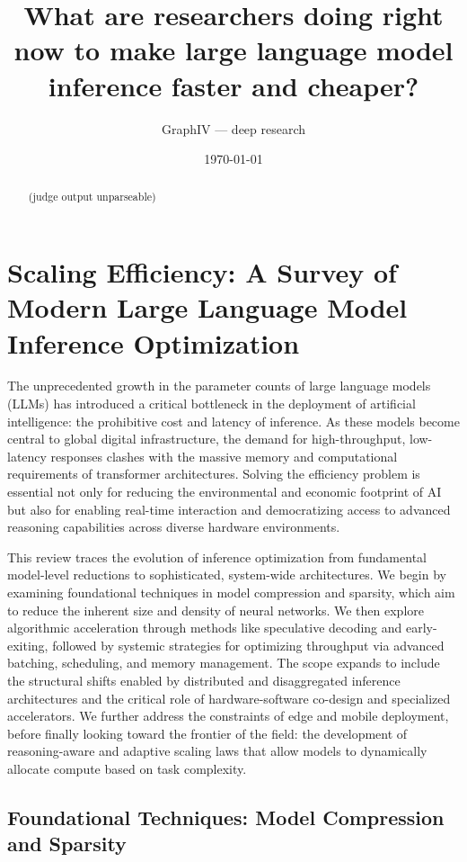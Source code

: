 \documentclass[11pt]{article}
\title{What are researchers doing right now to make large language model inference faster and cheaper?}
\author{GraphIV --- deep research}
\date{\today}
\begin{document}
\maketitle

\begin{abstract}
(judge output unparseable)
\end{abstract}

\section{Scaling Efficiency: A Survey of Modern Large Language Model Inference Optimization}

The unprecedented growth in the parameter counts of large language models (LLMs) has introduced a critical bottleneck in the deployment of artificial intelligence: the prohibitive cost and latency of inference. As these models become central to global digital infrastructure, the demand for high-throughput, low-latency responses clashes with the massive memory and computational requirements of transformer architectures. Solving the efficiency problem is essential not only for reducing the environmental and economic footprint of AI but also for enabling real-time interaction and democratizing access to advanced reasoning capabilities across diverse hardware environments.

This review traces the evolution of inference optimization from fundamental model-level reductions to sophisticated, system-wide architectures. We begin by examining foundational techniques in model compression and sparsity, which aim to reduce the inherent size and density of neural networks. We then explore algorithmic acceleration through methods like speculative decoding and early-exiting, followed by systemic strategies for optimizing throughput via advanced batching, scheduling, and memory management. The scope expands to include the structural shifts enabled by distributed and disaggregated inference architectures and the critical role of hardware-software co-design and specialized accelerators. We further address the constraints of edge and mobile deployment, before finally looking toward the frontier of the field: the development of reasoning-aware and adaptive scaling laws that allow models to dynamically allocate compute based on task complexity.

\subsection{Foundational Techniques: Model Compression and Sparsity}
\end{document}
